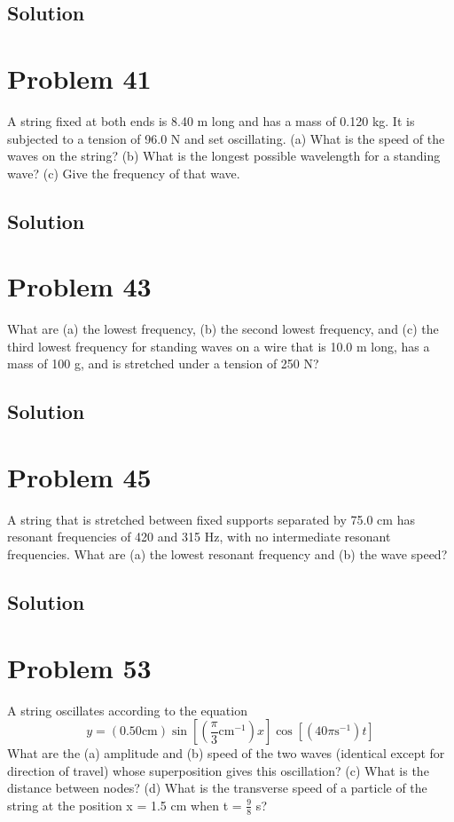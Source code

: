 \documentclass[12pt]{article}
\begin{document}
        \subsection{Solution}

    \section{Problem 41}
        A string fixed at both ends is 8.40 m long and has a mass of 0.120 kg. 
        It is subjected to a tension of 96.0 N and set oscillating. 
        (a) What is the speed of the waves on the string? 
        (b) What is the longest possible wavelength for a standing wave? 
        (c) Give the frequency of that wave.

        \subsection{Solution}

    \section{Problem 43}
        What are (a) the lowest frequency, (b) the second lowest frequency, and (c) the third lowest frequency for standing waves on a wire that is 10.0 m long, has a mass of 100 g, and is stretched under a tension of 250 N?

        \subsection{Solution}

    \section{Problem 45}
        A string that is stretched between fixed supports separated by 75.0 cm has resonant frequencies of 420 and 315 Hz, with no intermediate resonant frequencies. 
        What are (a) the lowest resonant frequency and (b) the wave speed?

        \subsection{Solution}

    \section{Problem 53}
        A string oscillates according to the equation
        \begin{equation}
            y = (0.50 \unit{\centi\meter}) \sin \left[  ( \frac{\pi}{3} \unit{\centi\meter^{-1}})x \right] \cos\left[ (40\pi \unit{\second^{-1}} )t \right]
        \end{equation}
        What are the (a) amplitude and (b) speed of the two waves (identical except for direction of travel) whose superposition gives this oscillation? 
        (c) What is the distance between nodes? 
        (d) What is the transverse speed of a particle of the string at the position x = 1.5 cm when t = $\frac{9}{8}$ s?
\end{document}
